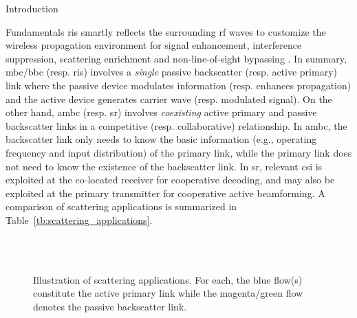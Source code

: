 \documentclass[journal]{IEEEtran}
\begin{document}
\begin{section}{Introduction}
\begin{subsection}{Fundamentals}
		\gls{ris} smartly reflects the surrounding \gls{rf} waves to customize the wireless propagation environment for signal enhancement, interference suppression, scattering enrichment and non-line-of-sight bypassing \cite{Wu2021b}.
		In summary, \gls{mbc}/\gls{bbc} (resp. \gls{ris}) involves a \emph{single} passive backscatter (resp. active primary) link where the passive device modulates information (resp. enhances propagation) and the active device generates carrier wave (resp. modulated signal).
		On the other hand, \gls{ambc} (resp. \gls{sr}) involves \emph{coexisting} active primary and passive backscatter links in a competitive (resp. collaborative) relationship.
		In \gls{ambc}, the backscatter link only needs to know the basic information (e.g., operating frequency and input distribution) of the primary link, while the primary link does not need to know the existence of the backscatter link.
		In \gls{sr}, relevant \gls{csi} is exploited at the co-located receiver for cooperative decoding, and may also be exploited at the primary transmitter for cooperative active beamforming.
		A comparison of scattering applications is summarized in Table~\ref{tb:scattering_applications}.

		\begin{figure}[!t]
			\centering
			\\
			\subfloat[\gls{sr}]{
				\resizebox{0.48\linewidth}{!}{
					
				}
				\label{fg:sr}
			}
			\\
			\subfloat[RIScatter]{
				\resizebox{0.48\linewidth}{!}{
					
				}
				\label{fg:riscatter}
			}
			\caption{
				Illustration of scattering applications.
				For each, the blue flow(s) constitute the active primary link while the magenta/green flow denotes the passive backscatter link.
			}
			\label{fg:scatter_illustration}
		\end{figure}
	\end{subsection}


\end{section}
\end{document}
